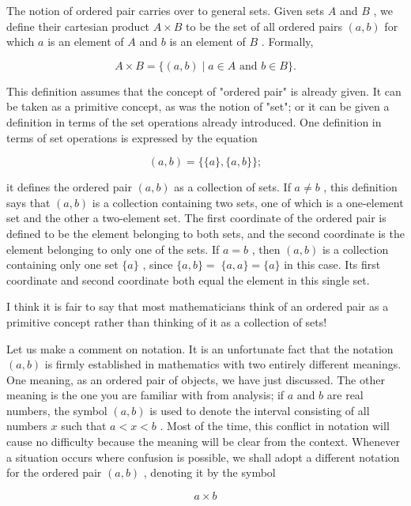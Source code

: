 \documentclass[10pt]{article}
\begin{document}
The notion of ordered pair carries over to general sets. Given sets \(A\) and \(B\) , we define their cartesian product \(A \times  B\) to be the set of all ordered pairs \(\left( {a,b}\right)\) for which \(a\) is an element of \(A\) and \(b\) is an element of \(B\) . Formally,

\[
A \times  B = \{ \left( {a,b}\right)  \mid  a \in  A\text{ and }b \in  B\} .
\]

This definition assumes that the concept of "ordered pair" is already given. It can be taken as a primitive concept, as was the notion of "set"; or it can be given a definition in terms of the set operations already introduced. One definition in terms of set operations is expressed by the equation

\[
\left( {a,b}\right)  = \{ \{ a\} ,\{ a,b\} \} ;
\]

it defines the ordered pair \(\left( {a,b}\right)\) as a collection of sets. If \(a \neq  b\) , this definition says that \(\left( {a,b}\right)\) is a collection containing two sets, one of which is a one-element set and the other a two-element set. The first coordinate of the ordered pair is defined to be the element belonging to both sets, and the second coordinate is the element belonging to only one of the sets. If \(a = b\) , then \(\left( {a,b}\right)\) is a collection containing only one set \(\{ a\}\) , since \(\{ a,b\}  = \; \{ a,a\}  = \{ a\}\) in this case. Its first coordinate and second coordinate both equal the element in this single set.

I think it is fair to say that most mathematicians think of an ordered pair as a primitive concept rather than thinking of it as a collection of sets!

Let us make a comment on notation. It is an unfortunate fact that the notation \(\left( {a,b}\right)\) is firmly established in mathematics with two entirely different meanings. One meaning, as an ordered pair of objects, we have just discussed. The other meaning is the one you are familiar with from analysis; if \(a\) and \(b\) are real numbers, the symbol \(\left( {a,b}\right)\) is used to denote the interval consisting of all numbers \(x\) such that \(a < x < b\) . Most of the time, this conflict in notation will cause no difficulty because the meaning will be clear from the context. Whenever a situation occurs where confusion is possible, we shall adopt a different notation for the ordered pair \(\left( {a,b}\right)\) , denoting it by the symbol

\[
a \times  b
\]
\end{document}
